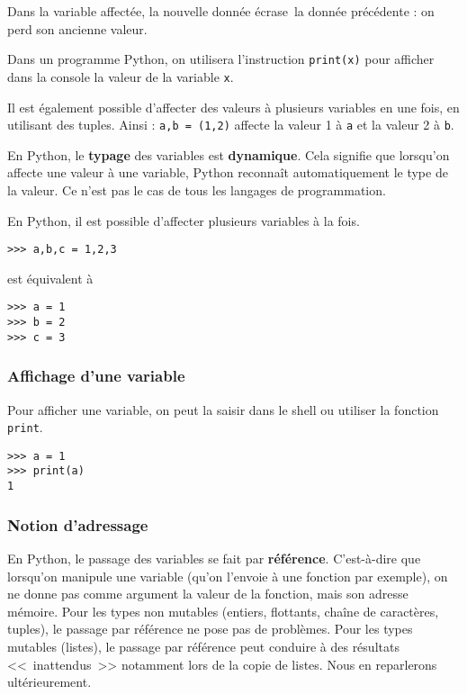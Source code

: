 Dans la variable affectée, la nouvelle donnée \og écrase\fg\ la donnée précédente : on perd son 
ancienne valeur.

Dans un programme Python, on utilisera l'instruction \lstinline{print(x)}
pour afficher dans la console la valeur de la variable \lstinline{x}.

Il est également possible d'affecter des valeurs à plusieurs variables en une fois, en utilisant 
des tuples. Ainsi : \lstinline{a,b = (1,2)} affecte la valeur 1 à \lstinline{a} et la valeur 2 à 
\lstinline{b}.


\begin{remarque}
En Python, le \textbf{typage} des variables est \textbf{dynamique}. Cela signifie que lorsqu'on affecte une valeur à une variable, Python reconnaît automatiquement le type de la valeur. Ce n'est pas le cas de tous les langages de programmation.
\end{remarque}


\begin{remarque}
En Python, il est possible d'affecter plusieurs variables à la fois.

\begin{lstlisting}
>>> a,b,c = 1,2,3
\end{lstlisting}

est équivalent à 


\begin{lstlisting}
>>> a = 1
>>> b = 2
>>> c = 3
\end{lstlisting}
\end{remarque}

\subsubsection*{Affichage d'une variable}
Pour afficher une variable, on peut la saisir dans le shell ou utiliser la fonction \lstinline{print}.
\begin{lstlisting}
>>> a = 1
>>> print(a)
1
\end{lstlisting}


\subsubsection*{Notion d'adressage}

En Python, le passage des variables se fait par \textbf{référence}. C'est-à-dire que lorsqu'on manipule une variable (qu'on l'envoie à une fonction par exemple), on ne donne pas comme argument la valeur de la fonction, mais son adresse mémoire. Pour les types non mutables (entiers, flottants, chaîne de caractères, tuples), le passage par référence ne pose pas de problèmes. Pour les types mutables (listes), le passage par référence peut conduire à des résultats <<~inattendus~>> notamment lors de la copie de listes. Nous en reparlerons ultérieurement.

